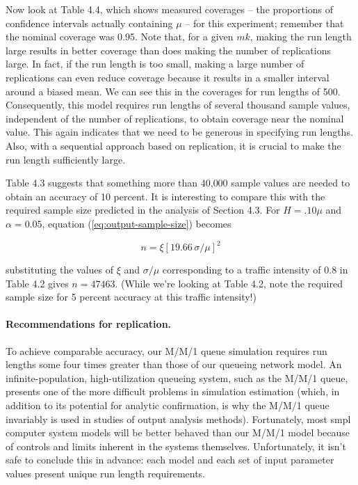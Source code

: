 Now look at Table 4.4, which shows measured coverages -- the proportions of
confidence intervals actually containing $\mu$ -- for this experiment;
remember that the nominal coverage was 0.95. Note that, for a given $mk$,
making the run length large results in better coverage than does making the
number of replications large. In fact, if the run length is too small, making a
large number of replications can even reduce coverage because it results in a
smaller interval around a biased mean. We can see this in the coverages for
run lengths of 500. Consequently, this model requires run lengths of several
thousand sample values, independent of the number of replications, to obtain
coverage near the nominal value. This again indicates that we need to be
generous in specifying run lengths. Also, with a sequential approach based
on replication, it is crucial to make the run length sufficiently large.

Table 4.3 suggests that something more than 40{,}000 sample values are
needed to obtain an accuracy of 10 percent. It is interesting to compare this
with the required sample size predicted in the analysis of Section 4.3. For
$H = .10\mu$ and $\alpha = 0.05$, equation (\ref{eq:output-sample-size}) becomes

\begin{equation}
n = \xi \left[19.66 \, \sigma/\mu \right]^2
\label{eq:output-sample-size-10}
\end{equation}

substituting the values of $\xi$ and $\sigma/\mu$ corresponding to a traffic
intensity of 0.8 in Table 4.2 gives $n = 47463$. (While we're looking at
Table 4.2, note the required sample size for 5 percent accuracy at this
traffic intensity!)

\paragraph{Recommendations for replication.}
To achieve comparable accuracy, our M/M/1 queue simulation requires run
lengths some four times greater than those of our queueing network model. An
infinite-population, high-utilization queueing system, such as the M/M/1
queue, presents one of the more difficult problems in simulation estimation
(which, in addition to its potential for analytic confirmation, is why the
M/M/1 queue invariably is used in studies of output analysis methods).
Fortunately, most smpl computer system models will be better behaved than our
M/M/1 model because of controls and limits inherent in the systems themselves.
Unfortunately, it isn't safe to conclude this in advance: each model and each
set of input parameter values present unique run length requirements.

